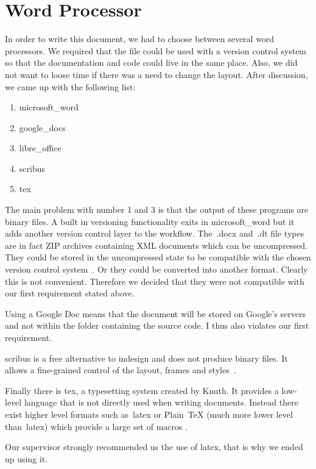 \section{Word Processor}

In order to write this document, we had to choose between several word
processors. We required that the file could be used with a version control
system so that the documentation and code could live in the same place. Also,
we did not want to loose time if there was a need to change the layout. After
discussion, we came up with the following list:

\begin{enumerate}
\item \Gls{microsoft_word}
\item \Gls{google_docs}
\item \Gls{libre_office}
\item \Gls{scribus}
\item \Gls{tex}
\end{enumerate}

The main problem with number 1 and 3 is that the output of these programs are 
binary files. A built in versioning functionality exits in \gls{microsoft_word}
but it adds another version control layer to the workflow. The~.docx and~.dt 
file types are in fact ZIP archives containing XML documents which can be 
uncompressed. They could be stored in the uncompressed state to be compatible
with the chosen version control system~\cite{zipdocextension}. Or they could 
be converted into another format. Clearly this is not convenient. Therefore we
decided that they were not compatible with our first requirement stated 
above.

Using a Google Doc means that the document will be stored on Google's servers 
and not within the folder containing the source code. I thus also violates our
first requirement.

\Gls{scribus} is a free alternative to \gls{indesign} and does not produce 
binary files. It allows a fine-grained control of the layout, frames and 
styles~\cite{ibm2013open}.

Finally there is \gls{tex}, a typesetting system created by Knuth. It provides 
a low-level language that is not directly used when writing documents. Instead 
there exist higher level formats such as~\gls{latex} or Plain~\TeX{} (much more
lower level than~\gls{latex}) which provide a large set of macros
\cite{levels2017}.

Our supervisor strongly recommended us the use of
\gls{latex}, that is why we ended up using it.
